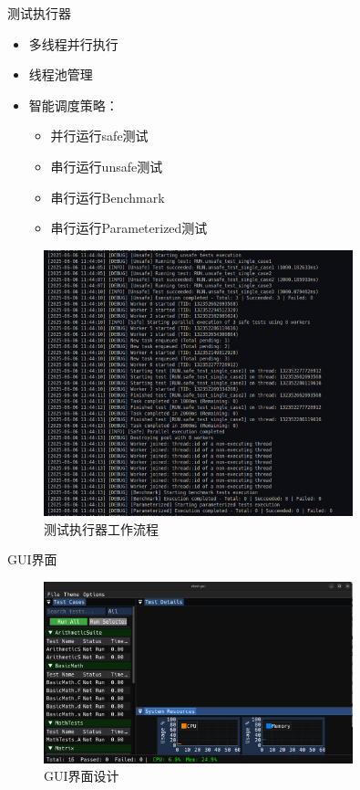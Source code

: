 \documentclass{beamer}
\begin{document}
\begin{frame}{测试执行器}
    \begin{itemize}
        \item 多线程并行执行
        \item 线程池管理
        \item 智能调度策略：
              \begin{itemize}
                  \item 并行运行safe测试
                  \item 串行运行unsafe测试
                  \item 串行运行Benchmark
                  \item 串行运行Parameterized测试
              \end{itemize}
    \end{itemize}

    \begin{figure}
        \centering
        \includegraphics[width=0.8\textwidth]{img/context.png}
        \caption{测试执行器工作流程}
    \end{figure}
\end{frame}

\begin{frame}{GUI界面}
    \begin{figure}
        \centering
        \includegraphics[width=0.8\textwidth]{img/gui.png}
        \caption{GUI界面设计}
    \end{figure}
\end{frame}
\end{document}
